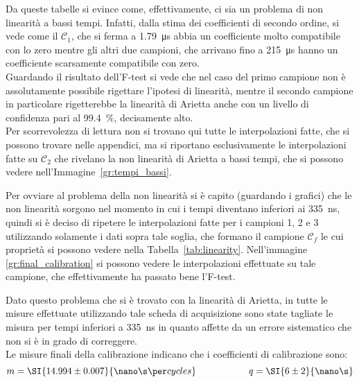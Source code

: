 Da queste tabelle si evince come, effettivamente, ci sia un problema di non linearità a bassi tempi. 
Infatti, dalla stima dei coefficienti di secondo ordine, si vede come il $\mathcal{C}_1$, che si ferma a \SI{1.79}{\micro\s} abbia un coefficiente molto compatibile con lo zero mentre gli altri due campioni, che arrivano fino a \SI{215}{\micro\s} hanno un coefficiente scarsamente compatibile con zero.\\

Guardando il risultato dell'F-test si vede che nel caso del primo campione non è assolutamente possibile rigettare l'ipotesi di linearità, mentre il secondo campione in particolare rigetterebbe la linearità di Arietta anche con un livello di confidenza pari al \SI{99.4}{\percent}, decisamente alto.\\


Per scorrevolezza di lettura non si trovano qui tutte le interpolazioni fatte, che si possono trovare nelle appendici, ma si riportano esclusivamente le interpolazioni fatte su $\mathcal{C}_2$  che rivelano la non linearità di Arietta a bassi tempi, che si possono vedere nell'Immagine~\ref{gr:tempi_bassi}.\\

Per ovviare al problema della non linearità si è capito (guardando i grafici) che le non linearità sorgono nel momento in cui i tempi diventano inferiori ai \SI{335}{\ns}, quindi si è deciso di ripetere le interpolazioni fatte per i campioni 1, 2 e 3 utilizzando solamente i dati sopra tale soglia, che formano il campione $\mathcal{C}_f$ le cui proprietà si possono vedere nella Tabella~\ref{tab:linearity}. 
Nell'immagine \ref{gr:final_calibration} si possono vedere le interpolazioni effettuate su tale campione, che effettivamente ha passato bene l'F-test.\\

Dato questo problema che si è trovato con la linearità di Arietta, in tutte le misure effettuate utilizzando tale scheda di acquisizione sono state tagliate le misura per tempi inferiori a \SI{335}{\ns} in quanto affette da un errore sistematico che non si è in grado di correggere.\\

Le misure finali della calibrazione indicano che i coefficienti di calibrazione sono:
\begin{equation}
  m = \SI{14.994 \pm 0.007}{\nano\s\per cycles} \hspace{2cm} q = \SI{6 \pm 2}{\nano\s}
\end{equation}


